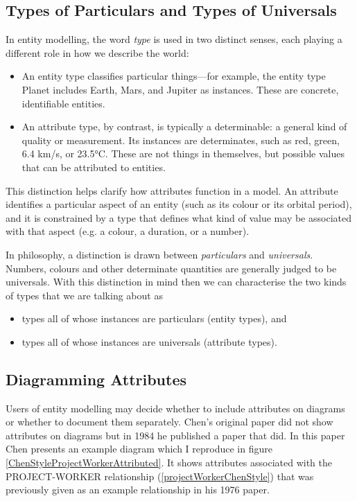 \subsection{Types of Particulars and Types of Universals}
In entity modelling, the word \textit{type} is used in two distinct senses, each playing a different role in how we describe the world:
\begin{itemize}
\item An entity type classifies particular things—for example, the entity type Planet includes Earth, Mars, and Jupiter as instances. These are concrete, identifiable entities.
\item An attribute type, by contrast, is typically a determinable: a general kind of quality or measurement. Its instances are determinates, such as red, green, 6.4 km/s, or 23.5°C. These are not things in themselves, but possible values that can be attributed to entities.
\end{itemize}
This distinction helps clarify how attributes function in a model. An attribute identifies a particular aspect of an entity (such as its colour or its orbital period), and it is constrained by a type that defines what kind of value may be associated with that aspect (e.g. a colour, a duration, or a number).

In philosophy, a distinction is drawn between \textit{particulars} and \textit{universals}. 
Numbers, colours and  other determinate quantities are generally judged to be universals. 
With this distinction in mind then we can characterise the two kinds of types that we are
talking about as
\begin{itemize}
\item types all of whose instances are particulars (entity types), and
\item types all of whose instances are universals (attribute types).  
\end{itemize} 

\subsection*{Diagramming Attributes}
\mynote
Users of entity modelling may decide whether to include attributes on diagrams or whether to document them
separately.
Chen's original paper did not show attributes on diagrams  but in 1984
he published a paper that did. In this  paper Chen presents an example diagram 
which I reproduce in figure  \ref{ChenStyleProjectWorkerAttributed}. 
It shows  attributes associated with the PROJECT-WORKER relationship (\ref{projectWorkerChenStyle}) that was previously given as an example relationship in his 1976 paper.

